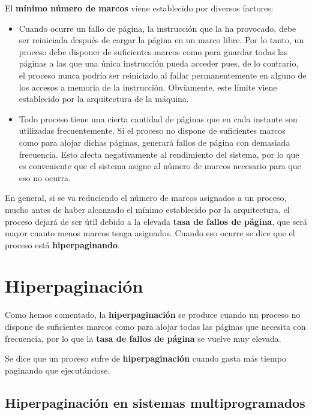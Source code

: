 El \textbf{mínimo número de marcos} viene establecido por diversos
factores:

\begin{itemize}
\item
  Cuando ocurre un fallo de página, la instrucción que la ha provocado,
  debe ser reiniciada después de cargar la página en un marco libre. Por
  lo tanto, un proceso debe disponer de suficientes marcos como para
  guardar todas las páginas a las que una única instrucción pueda
  acceder pues, de lo contrario, el proceso nunca podría ser reiniciado
  al fallar permanentemente en alguno de los accesos a memoria de la
  instrucción. Obviamente, este límite viene establecido por la
  arquitectura de la máquina.
\item
  Todo proceso tiene una cierta cantidad de páginas que en cada instante
  son utilizadas frecuentemente. Si el proceso no dispone de suficientes
  marcos como para alojar dichas páginas, generará fallos de página con
  demasiada frecuencia. Esto afecta negativamente al rendimiento del
  sistema, por lo que es conveniente que el sistema asigne al número de
  marcos necesario para que eso no ocurra.
\end{itemize}

En general, si se va reduciendo el número de marcos asignados a un
proceso, mucho antes de haber alcanzado el mínimo establecido por la
arquitectura, el proceso dejará de ser útil debido a la elevada
\textbf{tasa de fallos de página}, que será mayor cuanto menos marcos
tenga asignados. Cuando eso ocurre se dice que el proceso está
\textbf{hiperpaginando}.

\section{Hiperpaginación}\label{_hiperpaginaciuxf3n}

{} Como hemos comentado, la \textbf{hiperpaginación} se produce cuando
un proceso no dispone de suficientes marcos como para alojar todas las
páginas que necesita con frecuencia, por lo que la \textbf{tasa de
fallos de página} se vuelve muy elevada.

Se dice que un proceso sufre de \textbf{hiperpaginación} cuando gasta
más tiempo paginando que ejecutándose.

\subsection{Hiperpaginación en sistemas
multiprogramados}\label{_hiperpaginaciuxf3n_en_sistemas_multiprogramados}

